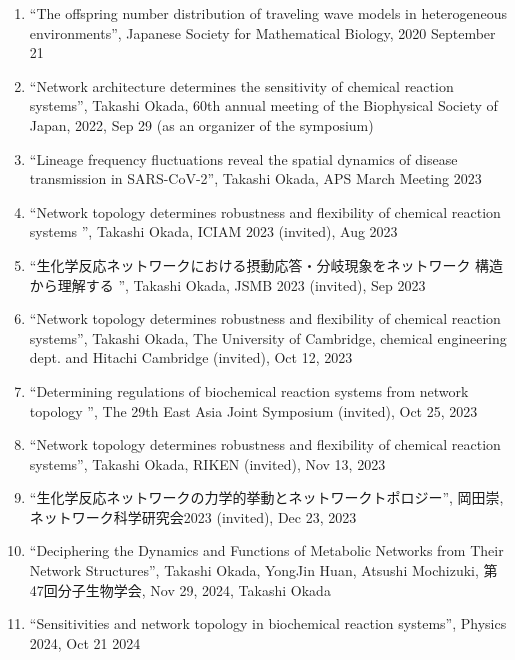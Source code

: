 \documentclass[letterpaper,12pt]{article}
\begin{document}
\begin{enumerate}
\item ``The offspring number distribution of traveling wave models in heterogeneous environments'', Japanese Society for Mathematical Biology,  2020 September 21



\item ``Network architecture determines the sensitivity of chemical reaction systems'', Takashi Okada,  60th annual meeting of the Biophysical Society of Japan, 2022,
Sep 29 (as an organizer of the symposium)

\item ``Lineage frequency fluctuations reveal the spatial dynamics of disease transmission in SARS-CoV-2'', Takashi Okada, APS March Meeting 2023

\item ``Network topology determines robustness and flexibility
 of chemical reaction systems '', Takashi Okada, ICIAM 2023 (invited), Aug 2023

\item ``生化学反応ネットワークにおける摂動応答・分岐現象をネットワーク 構造から理解する '', Takashi Okada, JSMB 2023 (invited), Sep 2023

\item ``Network topology determines
robustness and flexibility of chemical reaction systems'', Takashi Okada, The University of Cambridge, chemical engineering dept. and Hitachi Cambridge (invited), Oct 12, 2023

\item ``Determining regulations of biochemical reaction systems
from network topology '',  The 29th
East Asia Joint Symposium (invited), Oct 25, 2023

\item ``Network topology determines
robustness and flexibility of chemical reaction systems'', Takashi Okada, RIKEN (invited), Nov 13, 2023


\item ``生化学反応ネットワークの力学的挙動とネットワークトポロジー'', 岡田崇, ネットワーク科学研究会2023 (invited), Dec 23, 2023

\item ``Deciphering the Dynamics and Functions of Metabolic Networks
 from Their Network Structures'', Takashi Okada, YongJin Huan, Atsushi Mochizuki, 第47回分子生物学会, Nov 29, 2024, Takashi Okada

\item ``Sensitivities and network topology in biochemical reaction systems'', Physics 2024, Oct 21 2024


\end{enumerate}
\end{document}
